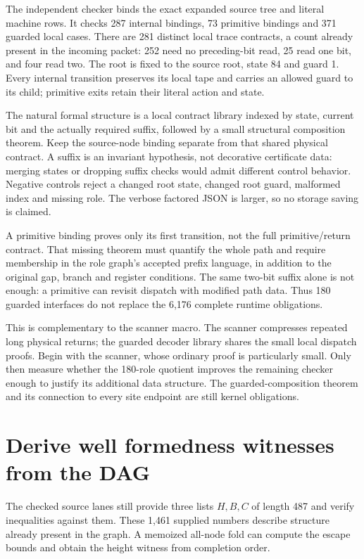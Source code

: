 \documentclass[11pt]{article}
\begin{document}
The independent checker binds the exact expanded source tree and literal machine rows. It checks 287 internal bindings, 73 primitive bindings and 371 guarded local cases. There are 281 distinct local trace contracts, a count already present in the incoming packet: 252 need no preceding-bit read, 25 read one bit, and four read two. The root is fixed to the source root, state 84 and guard 1. Every internal transition preserves its local tape and carries an allowed guard to its child; primitive exits retain their literal action and state.

The natural formal structure is a local contract library indexed by state, current bit and the actually required suffix, followed by a small structural composition theorem. Keep the source-node binding separate from that shared physical contract. A suffix is an invariant hypothesis, not decorative certificate data: merging states or dropping suffix checks would admit different control behavior. Negative controls reject a changed root state, changed root guard, malformed index and missing role. The verbose factored JSON is larger, so no storage saving is claimed.

A primitive binding proves only its first transition, not the full primitive/return contract. That missing theorem must quantify the whole path and require membership in the role graph's accepted prefix language, in addition to the original gap, branch and register conditions. The same two-bit suffix alone is not enough: a primitive can revisit dispatch with modified path data. Thus 180 guarded interfaces do not replace the 6,176 complete runtime obligations.

This is complementary to the scanner macro. The scanner compresses repeated long physical returns; the guarded decoder library shares the small local dispatch proofs. Begin with the scanner, whose ordinary proof is particularly small. Only then measure whether the 180-role quotient improves the remaining checker enough to justify its additional data structure. The guarded-composition theorem and its connection to every site endpoint are still kernel obligations.

\section{Derive well formedness witnesses from the DAG}
The checked source lanes still provide three lists $H,B,C$ of length 487 and verify inequalities against them. These 1,461 supplied numbers describe structure already present in the graph. A memoized all-node fold can compute the escape bounds and obtain the height witness from completion order.
\end{document}
